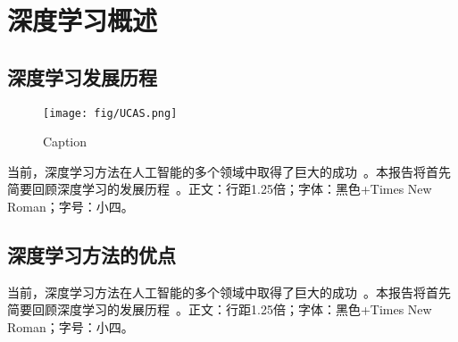 \documentclass[a4paper, AutoFakeBold]{article}
\title{\mytitle}
\author{xxx}
\date{\today}
\begin{document}
\maketitle

\setcounter{page}{1}
\begin{abstract}
这是一段摘要，用来占位。这是一段摘要，用来占位。这是一段摘要，用来占位。这是一段摘要，用来占位。这是一段摘要，用来占位。这是一段摘要，用来占位。这是一段摘要，用来占位。这是一段摘要，用来占位。这是一段摘要，用来占位。这是一段摘要，用来占位。这是一段摘要，用来占位。这是一段摘要，用来占位。这是一段摘要，用来占位。这是一段摘要，用来占位。这是一段摘要，用来占位。这是一段摘要，用来占位。这是一段摘要，用来占位。这是一段摘要，用来占位。这是一段摘要，用来占位。这是一段摘要，用来占位。这是一段摘要，用来占位。这是一段摘要，用来占位。这是一段摘要，用来占位。这是一段摘要，用来占位。这是一段摘要，用来占位。这是一段摘要，用来占位。这是一段摘要，用来占位。这是一段摘要，用来占位。这是一段摘要，用来占位。这是一段摘要，用来占位。这是一段摘要，用来占位。这是一段摘要，用来占位。这是一段摘要，用来占位。这是一段摘要，用来占位。这是一段摘要，用来占位。这是一段摘要，用来占位。这是一段摘要，用来占位。这是一段摘要，用来占位。这是一段摘要，用来占位。这是一段摘要，用来占位。这是一段摘要，用来占位。这是一段摘要，用来占位。这是一段摘要，用来占位。这是一段摘要，用来占位。这是一段摘要，用来占位。这是一段摘要，用来占位。这是一段摘要，用来占位。这是一段摘要，用来占位。这是一段摘要，用来占位。这是一段摘要，用来占位。这是一段摘要，用来占位。这是一段摘要，用来占位。这是一段摘要，用来占位。这是一段摘要，用来占位。
\end{abstract}
\section{深度学习概述}
\subsection{深度学习发展历程}
\begin{figure}
    \centering
    \texttt{[image: fig/UCAS.png]}
    \caption{Caption}
    \label{fig:enter-label}
\end{figure}
当前，深度学习方法在人工智能的多个领域中取得了巨大的成功~\cite{defferrard2016convolutional}。本报告将首先简要回顾深度学习的发展历程~\cite{hechtlinger2017generalization}。正文：行距1.25倍；字体：黑色+Times New Roman；字号：小四。
\subsection{深度学习方法的优点}
当前，深度学习方法在人工智能的多个领域中取得了巨大的成功~\cite{huang2017densely}。本报告将首先简要回顾深度学习的发展历程~\cite{marzano2007rainfall}。正文：行距1.25倍；字体：黑色+Times New Roman；字号：小四。
\end{document}
